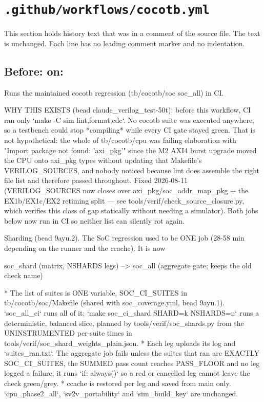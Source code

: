 \section{\texttt{.github/workflows/cocotb.yml}}\label{cr:flow:ci-cocotb}

This section holds history text that was in a comment of the source file. The text is unchanged. Each line has no leading comment marker and no indentation.

\begin{record}

\subsection*{Before: on:}

\begin{textblock}
Runs the maintained cocotb regression (tb/cocotb/soc soc_all) in CI.

WHY THIS EXISTS (bead claude_verilog_test-50t): before this workflow, CI ran
only `make -C sim {lint,format,cdc}`. No cocotb suite was executed anywhere,
so a testbench could stop *compiling* while every CI gate stayed green. That
is not hypothetical: the whole of tb/cocotb/cpu was failing elaboration with
"Import package not found: 'axi_pkg'" since the M2 AXI4 burst upgrade moved
the CPU onto axi_pkg types without updating that Makefile's VERILOG_SOURCES,
and nobody noticed because lint does assemble the right file list and
therefore passed throughout. Fixed 2026-08-11 (VERILOG_SOURCES now closes
over axi_pkg/soc_addr_map_pkg + the EX1b/EX1c/EX2 retiming split — see
tools/verif/check_source_closure.py, which verifies this class of gap
statically without needing a simulator). Both jobs below now run in CI so
neither list can silently rot again.

Sharding (bead 9ayu.2).  The SoC regression used to be ONE job (28-58 min depending on the runner
and the ccache).  It is now

  soc_shard (matrix, NSHARDS legs) --> soc_all  (aggregate gate; keeps the old check name)

* The list of suites is ONE variable, SOC_CI_SUITES in tb/cocotb/soc/Makefile (shared with
  soc_coverage.yml, bead 9ayu.1).  `soc_all_ci` runs all of it; `make soc_ci_shard SHARD=k
  NSHARDS=n` runs a deterministic, balanced slice, planned by tools/verif/soc_shards.py from the
  UNINSTRUMENTED per-suite times in tools/verif/soc_shard_weights_plain.json.
* Each leg uploads its log and `suites_ran.txt`.  The aggregate job fails unless the suites that
  ran are EXACTLY SOC_CI_SUITES, the SUMMED pass count reaches PASS_FLOOR and no leg logged a
  failure; it runs `if: always()` so a red or cancelled leg cannot leave the check green/grey.
* ccache is restored per leg and saved from main only.
`cpu_phase2_all`, `sv2v_portability` and `sim_build_key` are unchanged.


\end{textblock}
\end{record}
